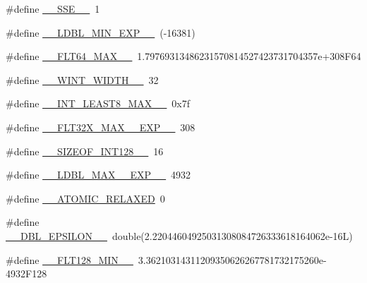 \begin{DoxyCompactItemize}
\item 
\#define \hyperlink{cmake-build-debug_2babel__client__autogen_2moc__predefs_8h_a7f85a85bc12e5cc7526909a91780f70a}{\+\_\+\+\_\+\+S\+S\+E\+\_\+\+\_\+}~1
\item 
\#define \hyperlink{cmake-build-debug_2babel__client__autogen_2moc__predefs_8h_ac3707c00cdbb574b68fd6263ac4d0407}{\+\_\+\+\_\+\+L\+D\+B\+L\+\_\+\+M\+I\+N\+\_\+\+E\+X\+P\+\_\+\+\_\+}~(-\/16381)
\item 
\#define \hyperlink{cmake-build-debug_2babel__client__autogen_2moc__predefs_8h_a01d0061df498c537ecd56d53f1130082}{\+\_\+\+\_\+\+F\+L\+T64\+\_\+\+M\+A\+X\+\_\+\+\_\+}~1.\+79769313486231570814527423731704357e+308\+F64
\item 
\#define \hyperlink{cmake-build-debug_2babel__client__autogen_2moc__predefs_8h_a5fa28f9bc424c535269b607039836f19}{\+\_\+\+\_\+\+W\+I\+N\+T\+\_\+\+W\+I\+D\+T\+H\+\_\+\+\_\+}~32
\item 
\#define \hyperlink{cmake-build-debug_2babel__client__autogen_2moc__predefs_8h_adc1ccadf1d98117e586324ccb189c09f}{\+\_\+\+\_\+\+I\+N\+T\+\_\+\+L\+E\+A\+S\+T8\+\_\+\+M\+A\+X\+\_\+\+\_\+}~0x7f
\item 
\#define \hyperlink{cmake-build-debug_2babel__client__autogen_2moc__predefs_8h_ae540090d44c675c8d75037333a21ae3d}{\+\_\+\+\_\+\+F\+L\+T32\+X\+\_\+\+M\+A\+X\+\_\+\_\+\+E\+X\+P\+\_\+\+\_\+}~308
\item 
\#define \hyperlink{cmake-build-debug_2babel__client__autogen_2moc__predefs_8h_a1433791b35cde12c112c2ef54b61a4d2}{\+\_\+\+\_\+\+S\+I\+Z\+E\+O\+F\+\_\+\+I\+N\+T128\+\_\+\+\_\+}~16
\item 
\#define \hyperlink{cmake-build-debug_2babel__client__autogen_2moc__predefs_8h_afc6ac46966747a9423f4a6bb3af94b55}{\+\_\+\+\_\+\+L\+D\+B\+L\+\_\+\+M\+A\+X\+\_\+\_\+\+E\+X\+P\+\_\+\+\_\+}~4932
\item 
\#define \hyperlink{cmake-build-debug_2babel__client__autogen_2moc__predefs_8h_a8faf1f097f05558889df4c44d052d35e}{\+\_\+\+\_\+\+A\+T\+O\+M\+I\+C\+\_\+\+R\+E\+L\+A\+X\+ED}~0
\item 
\#define \hyperlink{cmake-build-debug_2babel__client__autogen_2moc__predefs_8h_a54983bc256dc296a42fe88b9be24f268}{\+\_\+\+\_\+\+D\+B\+L\+\_\+\+E\+P\+S\+I\+L\+O\+N\+\_\+\+\_\+}~double(2.\+22044604925031308084726333618164062e-\/16\+L)
\item 
\#define \hyperlink{cmake-build-debug_2babel__client__autogen_2moc__predefs_8h_a8f41f2e3963dd91abee2b29461361f02}{\+\_\+\+\_\+\+F\+L\+T128\+\_\+\+M\+I\+N\+\_\+\+\_\+}~3.\+36210314311209350626267781732175260e-\/4932\+F128

\end{DoxyCompactItemize}
